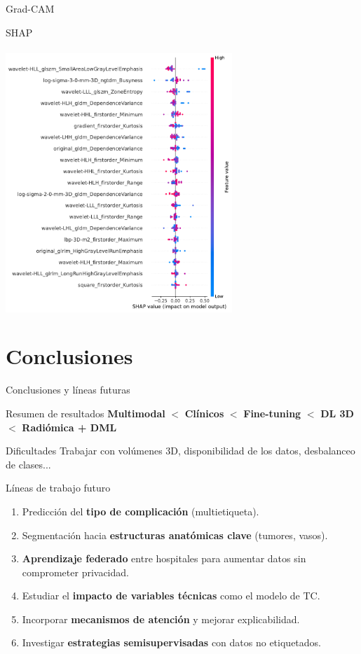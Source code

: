\documentclass{beamer}
\begin{document}
\begin{frame}{Grad-CAM}
\end{frame}


\begin{frame}{SHAP}
\framesubtitle{\insertsubsectionhead}    
\centering
\includegraphics[width=0.64\textwidth]{img/shap_summary_plot_lighbmg_extended.pdf}
\end{frame}




\section{Conclusiones}
\begin{frame}{Conclusiones y líneas futuras}
\begin{block}{Resumen de resultados}
\centering
\textbf{Multimodal} $<$ \textbf{Clínicos} $<$ \textbf{Fine-tuning} $<$ \textbf{DL 3D} $<$ \textbf{Radiómica + DML}
\end{block}

\begin{block}{Dificultades}
\footnotesize
Trabajar con volúmenes 3D, disponibilidad de los datos, desbalanceo de clases...
\end{block}

\begin{block}{Líneas de trabajo futuro}
\footnotesize
\begin{enumerate}
    \item Predicción del \textbf{tipo de complicación} (multietiqueta).
    \item Segmentación hacia \textbf{estructuras anatómicas clave} (tumores, vasos).
    \item \textbf{Aprendizaje federado} entre hospitales para aumentar datos sin comprometer privacidad.
    \item Estudiar el \textbf{impacto de variables técnicas} como el modelo de TC.
    \item Incorporar \textbf{mecanismos de atención} y mejorar explicabilidad.
    \item Investigar \textbf{estrategias semisupervisadas} con datos no etiquetados.
\end{enumerate}
\end{block}

\end{frame}
\end{document}
